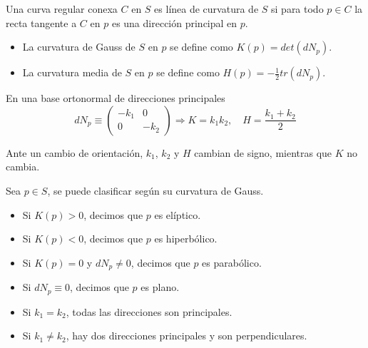 \begin{definition}
    Una curva regular conexa $C$ en $S$ es línea de curvatura de $S$ si para todo $p \in C$ la recta tangente a $C$ en $p$ es una dirección principal en $p$.
\end{definition}

\begin{definition}
    \hfill
    \begin{itemize}
        \item La curvatura de Gauss de $S$ en $p$ se define como $K(p) = det(dN_p)$.
        \item La curvatura media de $S$ en $p$ se define como $H(p) = -\frac{1}{2} tr(dN_p)$.
    \end{itemize}
\end{definition}

\begin{remark}
    En una base ortonormal de direcciones principales
    $$dN_p \equiv
        \begin{pmatrix}
            -k_1 & 0    \\
            0    & -k_2
        \end{pmatrix} \Rightarrow
        K = k_1 k_2, \quad H = \frac{k_1+k_2}{2}$$
\end{remark}

\begin{remark}
    Ante un cambio de orientación, $k_1$, $k_2$ y $H$ cambian de signo, mientras que $K$ no cambia.
\end{remark}

\begin{definition}
    Sea $p \in S$, se puede clasificar según su curvatura de Gauss.
    \begin{itemize}
        \item Si $K(p) > 0$, decimos que $p$ es elíptico.
        \item Si $K(p) < 0$, decimos que $p$ es hiperbólico.
        \item Si $K(p) = 0$ y $dN_p \neq 0$, decimos que $p$ es parabólico.
        \item Si $dN_p \equiv 0$, decimos que $p$ es plano.
    \end{itemize}
\end{definition}

\begin{remark}
    \hfill
    \begin{itemize}
        \item Si $k_1 = k_2$, todas las direcciones son principales.
        \item Si $k_1 \neq k_2$, hay dos direcciones principales y son perpendiculares.
    \end{itemize}
\end{remark}

